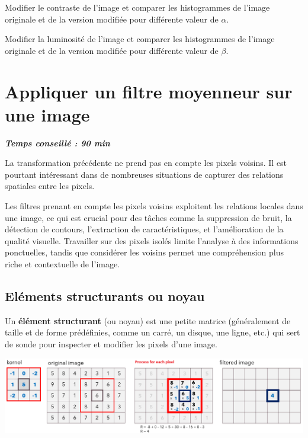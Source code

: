 \documentclass[a4paper,11pt,titlepage]{article} %
\begin{document}
\Manip Modifier le contraste de l'image et comparer les histogrammes de l'image originale et de la version modifiée pour différente valeur de $\alpha$.

\Manip Modifier la luminosité de l'image et comparer les histogrammes de l'image originale et de la version modifiée pour différente valeur de $\beta$.


\section{Appliquer un filtre moyenneur sur une image}

\begin{center} \textbf{\textit{Temps conseillé : 90 min}} \end{center}

La transformation précédente ne prend pas en compte les pixels voisins. Il est pourtant intéressant dans de nombreuses situations de capturer des relations spatiales entre les pixels.

Les filtres prenant en compte les pixels voisins exploitent les relations locales dans une image, ce qui est crucial pour des tâches comme la suppression de bruit, la détection de contours, l'extraction de caractéristiques, et l'amélioration de la qualité visuelle. Travailler sur des pixels isolés limite l'analyse à des informations ponctuelles, tandis que considérer les voisins permet une compréhension plus riche et contextuelle de l'image.

\subsection{Eléments structurants ou noyau}

Un \textbf{élément structurant} (ou noyau) est une petite matrice (généralement de taille et de forme prédéfinies, comme un carré, un disque, une ligne, etc.) qui sert de sonde pour inspecter et modifier les pixels d'une image.  

\begin{center}
	\includegraphics[width=\textwidth]{images/kernel.png}
\end{center}
\end{document}
